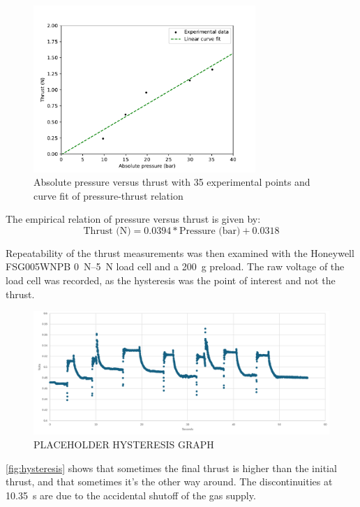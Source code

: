             \begin{figure}[!ht]
                \centering
                \includegraphics[width=0.75\textwidth]{assets/4 experiments/pressure-thrust graph.pdf}
                \caption{Absolute pressure versus thrust with 35 experimental points and curve fit of pressure-thrust relation}
                \label{fig:coldflow pressure-thrust}
            \end{figure}

            The empirical relation of pressure versus thrust is given by:
            \[
            \text{Thrust (N)} = 0.0394*\text{Pressure (bar)} + 0.0318
            \]

            Repeatability of the thrust measurements was then examined with the Honeywell FSG005WNPB \qtyrange{0}{5}{N} load cell and a \qty{200}{g} preload. The raw voltage of the load cell was recorded, as the hysteresis was the point of interest and not the thrust. 
            \begin{figure}[h]
                \centering
                \includegraphics[width=0.8\linewidth]{assets/5 discussion/hysterisis.png}
                \caption{PLACEHOLDER HYSTERESIS GRAPH}
                \label{fig:hysteresis}
            \end{figure}
            \autoref{fig:hysteresis} shows that sometimes the final thrust is higher than the initial thrust, and that sometimes it's the other way around. The discontinuities at \qtylist{10,35}{s} are due to the accidental shutoff of the gas supply.

